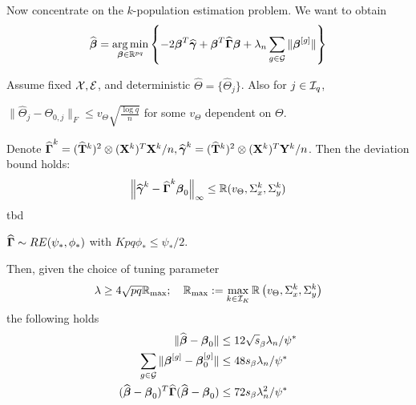 \documentclass[12pt, letterpaper]{article}
\theoremstyle{definition}
\DeclareMathOperator*{\ve}{vec}
\DeclareMathOperator*{\argmin}{arg\,min}
\numberwithin{equation}{section}
\begin{document}
\hrulefill

Now concentrate on the $k$-population estimation problem. We want to obtain
%
$$
\widehat \bfbeta = \argmin_{\bfbeta \in \BR^{pq}} \left\{-2 \bfbeta^T \widehat \bfgamma + \bfbeta^T \widehat \bfGamma \bfbeta + \lambda_n \sum_{g \in \cG} \| \bfbeta^{[g]}  \| \right\}
$$
\begin{Theorem}\label{thm:BetaThm}
Assume fixed ${\cal{X}}, {\cal{E}}$, and deterministic $\widehat \Theta = \{ \widehat \Theta_j \}$. Also for $j \in {\cal{I}}_q$,

 $\| \widehat \Theta_j - \Theta_{0,j} \|_F \leq v_\Theta \sqrt{\frac{\log q}{n}}$ for some $v_\Theta$ dependent on $\Theta$.

 Denote $\widehat {{\boldsymbol{\Gamma}}}^k = (\widehat {{\mathbf{T}}}^k)^2 \otimes ({\mathbf{X}}^k)^T {\mathbf{X}}^k/n, \widehat {{\boldsymbol{\gamma}}}^k = (\widehat {{\mathbf{T}}}^k)^2 \otimes ({\mathbf{X}}^k)^T {\mathbf{Y}}^k/n$. Then the deviation bound holds:
%
$$
\left\| \widehat {{\boldsymbol{\gamma}}}^k - \widehat {{\boldsymbol{\Gamma}}}^k {\boldsymbol{\beta}}_0 \right\|_\infty \leq {\mathbb{R}}( v_\Theta, \Sigma_x^k, \Sigma_y^k)
$$
%
{\colrbf tbd}

 $\widehat {{\boldsymbol{\Gamma}}} \sim RE(\psi_*, \phi_*)$ with $Kpq \phi_* \leq \psi_*/2$.

Then, given the choice of tuning parameter
%
$$
\lambda \geq 4 \sqrt{pq} {\mathbb{R}}_{\max}; \quad {\mathbb{R}}_{\max} := \max_{k \in {\cal{I}}_K} {\mathbb{R}} \left(v_\Theta, \Sigma_x^k, \Sigma_y^k \right)
$$
%
the following holds
%
\begin{align}
\| \widehat {{\boldsymbol{\beta}}} - {\boldsymbol{\beta}}_0 \| & \leq 12 \sqrt s_\beta \lambda_n / \psi^* \label{eqn:BetaThmEqn1}\\
\sum_{g \in {\cal{G}}} \| {\boldsymbol{\beta}}^{[g]} - {\boldsymbol{\beta}}_0^{[g]} \| & \leq 48 s_\beta \lambda_n / \psi^* \label{eqn:BetaThmEqn2}\\
(\widehat {{\boldsymbol{\beta}}} - {\boldsymbol{\beta}}_0 )^T \widehat {{\boldsymbol{\Gamma}}} (\widehat {{\boldsymbol{\beta}}} - {\boldsymbol{\beta}}_0 ) & \leq
72 s_\beta \lambda_n^2 / \psi^* \label{eqn:BetaThmEqn3}
\end{align}
%
\end{Theorem}
\end{document}
